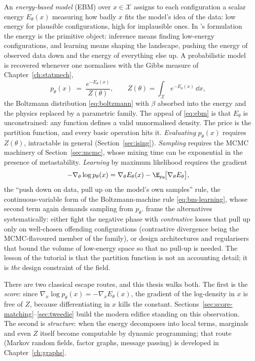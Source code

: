 An \emph{energy-based model} (EBM) over $x \in \mathcal{X}$ assigns to
each configuration a scalar energy $E_\theta(x)$ measuring how badly $x$
fits the model's idea of the data: low energy for plausible
configurations, high for implausible ones. In
\citeauthor{lecun2006tutorial}'s formulation the energy is the primitive
object: inference means finding low-energy configurations, and learning
means shaping the landscape, pushing the energy of observed data down and
the energy of everything else up. A probabilistic model is recovered
whenever one normalises with the Gibbs measure of
Chapter~\ref{ch:statmech},
\begin{equation}
  p_\theta(x) \;=\; \frac{e^{-E_\theta(x)}}{Z(\theta)},
  \qquad
  Z(\theta) = \int_{\mathcal{X}} e^{-E_\theta(x)}\, \dd x ,
  \label{eq:ebm}
\end{equation}
the Boltzmann distribution \eqref{eq:boltzmann} with $\beta$ absorbed
into the energy and the physics replaced by a parametric family. The
appeal of \eqref{eq:ebm} is that $E_\theta$ is unconstrained: any
function defines a valid unnormalised density. The price is the
partition function, and every basic operation hits it. \emph{Evaluating}
$p_\theta(x)$ requires $Z(\theta)$, intractable in general
(Section~\ref{sec:ising}). \emph{Sampling} requires the MCMC machinery of
Section~\ref{sec:mcmc}, whose mixing time can be exponential in the
presence of metastability. \emph{Learning} by maximum likelihood requires
the gradient
\begin{equation}
  -\nabla_\theta \log p_\theta(x)
  = \nabla_\theta E_\theta(x)
  - \E_{p_\theta}\!\big[ \nabla_\theta E_\theta \big],
  \label{eq:ebm-gradient}
\end{equation}
the ``push down on data, pull up on the model's own samples'' rule, the
continuous-variable form of the Boltzmann-machine rule
\eqref{eq:bm-learning}, whose second term again demands sampling from
$p_\theta$. \citet{lecun2006tutorial} frame the alternatives
systematically: either fight the negative phase with \emph{contrastive}
losses that pull up only on well-chosen offending configurations
(contrastive divergence \citep{hinton2002training} being the
MCMC-flavoured member of the family), or design architectures and
regularisers that bound the volume of low-energy space so that no pull-up
is needed. The lesson of the tutorial is that the partition function is
not an accounting detail; it is \emph{the} design constraint of the
field.

There are two classical escape routes, and this thesis walks both. The
first is the \emph{score}: since
$\nabla_x \log p_\theta(x) = -\nabla_x E_\theta(x)$, the gradient of the
log-density in $x$ is free of $Z$, because differentiating in $x$ kills
the constant. Sections~\ref{sec:score-matching}--\ref{sec:tweedie} build
the modern edifice standing on this observation. The second is
\emph{structure}: when the energy decomposes into local terms, marginals
and even $Z$ itself become computable by dynamic programming; that route
(Markov random fields, factor graphs, message passing) is developed in
Chapter~\ref{ch:graphs}.

